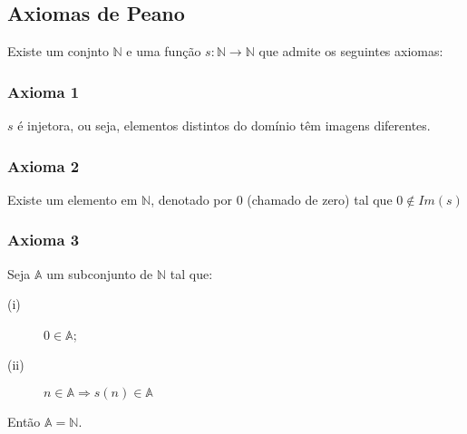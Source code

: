 \subsection*{Axiomas de Peano}
Existe um conjnto $\mathbb{N}$ e uma função $s : \mathbb{N} \longrightarrow \mathbb{N}$ que admite os seguintes axiomas:

\subsubsection*{Axioma 1}
$s$ é injetora, ou seja, elementos distintos do domínio têm imagens diferentes.

\subsubsection*{Axioma 2}
Existe um elemento em $\mathbb{N}$, denotado por $0$ (chamado de zero) tal que $0 \notin Im(s)$

\subsubsection*{Axioma 3}
Seja $\mathbb{A}$ um subconjunto de $\mathbb{N}$ tal que:
\begin{description}
    \item[(i)] $0  \in \mathbb{A}$;
    \item[(ii)] $n \in \mathbb{A} \Rightarrow s(n) \in \mathbb{A}$
\end{description}
Então $\mathbb{A} = \mathbb{N}$.
